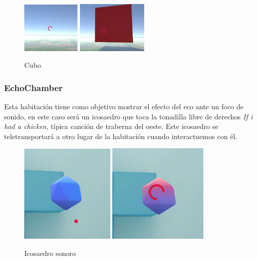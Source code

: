 \begin{figure}[htb]
	\centering
	\includegraphics[width=0.248\textwidth]{./imagenes/inactiveCube}
	\includegraphics[width=0.3\textwidth]{./imagenes/activeCube}
	\caption{Cubo}
\end{figure} 

	\subsubsection{EchoChamber}
\quad Esta habitación tiene como objetivo mostrar el efecto del eco ante un foco de sonido, en este caso será un icosaedro que toca la tonadilla libre de derechos \textit{If i had a chicken}, típica canción de traberna del oeste. Este icosaedro se teletransportará a otro lugar de la habitación cuando interactuemos con él.\\

\begin{figure}[htb]
	\centering
	\includegraphics[width=0.4\textwidth]{./imagenes/icosaedroInactivo}
	\includegraphics[width=0.4229\textwidth]{./imagenes/icosaedroActivo}
	\caption{Icosaedro sonoro}
\end{figure} 


